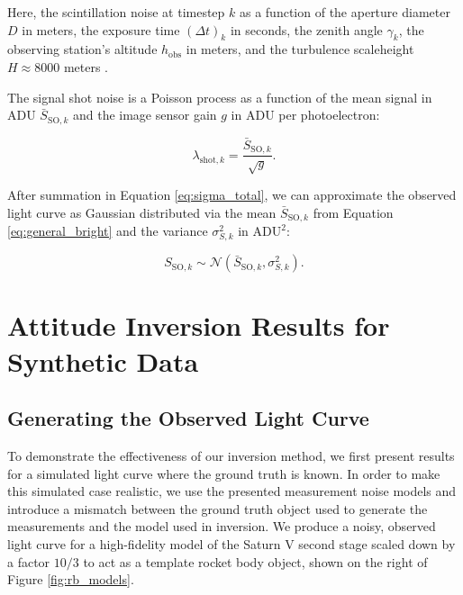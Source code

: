 \documentclass[a4paper,twocolumn]{spaceDebrisC} %
\newcommand{\figsmall}[0]{0.3\textwidth}
\begin{document}
Here, the scintillation noise at timestep $k$ as a function of the aperture diameter $D$ in meters, the exposure time $(\Delta t)_k$ in seconds, the zenith angle $\gamma_k$, the observing station's altitude $h_\text{obs}$ in meters, and the turbulence scaleheight $H\approx8000$ meters \cite{osborn2015}.

The signal shot noise is a Poisson process as a function of the mean signal in ADU $\bar{S}_{\text{SO},k}$ and the image sensor gain $g$ in ADU per photoelectron:

\begin{equation}
  \lambda_{\text{shot},k} = \frac{\bar{S}_{\text{SO},k}}{\sqrt{g}}.
\end{equation}

After summation in Equation \ref{eq:sigma_total}, we can approximate the observed light curve as Gaussian distributed via the mean $\bar{S}_{\text{SO},k}$ from Equation \ref{eq:general_bright} and the variance $\sigma^2_{S,k}$ in $\text{ADU}^2$:

\begin{equation} \label{eq:lc_dist}
 S_{\text{SO},k} \sim \mathcal{N}\left( \bar{S}_{\text{SO},k}, \sigma^2_{S,k} \right).
 \end{equation}

\section{Attitude Inversion Results for Synthetic Data}

\subsection{Generating the Observed Light Curve}


To demonstrate the effectiveness of our inversion method, we first present results for a simulated light curve where the ground truth is known. In order to make this simulated case realistic, we use the presented measurement noise models and introduce a mismatch between the ground truth object used to generate the measurements and the model used in inversion. We produce a noisy, observed light curve for a high-fidelity model of the Saturn V second stage scaled down by a factor $10/3$ to act as a template rocket body object, shown on the right of Figure \ref{fig:rb_models}.

\end{document}
